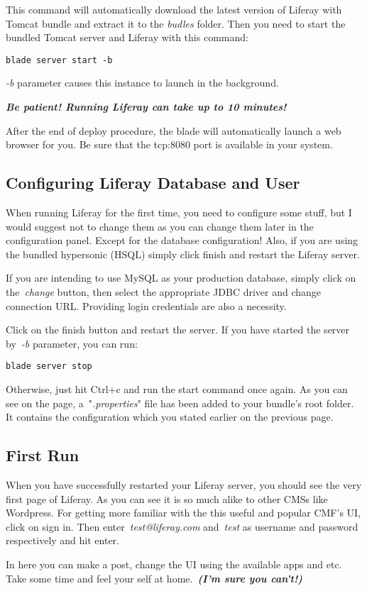 This command will automatically download the latest version of Liferay with Tomcat bundle and extract it to the \textit{budles} folder.
Then you need to start the bundled Tomcat server and Liferay with this command:

\lstset{language=bash}
\begin{lstlisting}
blade server start -b
\end{lstlisting}

\textit{-b} parameter causes this instance to launch in the background.

\textbf{\textit{Be patient! Running Liferay can take up to 10 minutes!}}

After the end of deploy procedure, the blade will automatically launch a web browser for you. Be sure that the tcp:8080 port is available in your system.

\subsection{Configuring Liferay Database and User}

When running Liferay for the first time, you need to configure some stuff, but I would suggest not to change them as you can change them later in the configuration panel. Except for the database configuration! Also, if you are using the bundled hypersonic (HSQL) simply click finish and restart the Liferay server.

If you are intending to use MySQL as your production database, simply click on the \textit{change} button, then select the appropriate JDBC driver and change connection URL. Providing login credentials are also a necessity.

Click on the finish button and restart the server. If you have started the server by \textit{-b} parameter, you can run:

\begin{lstlisting}
blade server stop
\end{lstlisting}

Otherwise, just hit Ctrl+c and run the start command once again. As you can see on the page, a "\textit{.properties}" file has been added to your bundle's root folder. It contains the configuration which you stated earlier on the previous page.

\subsection{First Run}

When you have successfully restarted your Liferay server, you should see the very first page of Liferay. As you can see it is so much alike to other CMSs like Wordpress. For getting more familiar with the this useful and popular CMF's UI, click on sign in. Then enter \textit{test@liferay.com} and \textit{test} as username and password respectively and hit enter.

In here you can make a post, change the UI using the available apps and etc. Take some time and feel your self at home. \textit{\textbf{(I'm sure you can't!)}}
